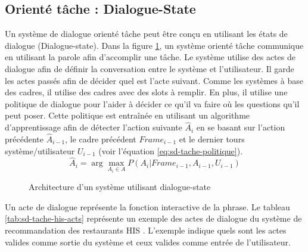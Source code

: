\documentclass{KodeBook}
\begin{document}
\subsection{Orienté tâche : Dialogue-State}

Un système de dialogue orienté tâche peut être conçu en utilisant les états de dialogue (Dialogue-state). 
Dans la figure \ref{fig:sd-tache-dial-state}, un système orienté tâche communique en utilisant la parole afin d'accomplir une tâche. 
Le système utilise des actes de dialogue afin de définir la conversation entre le système et l'utilisateur. 
Il garde les actes passés afin de décider quel est l'acte suivant.
Comme les systèmes à base des cadres, il utilise des cadres avec des slots à remplir. 
En plus, il utilise une politique de dialogue pour l'aider à décider ce qu'il va faire où les questions qu'il peut poser. 
Cette politique est entraînée en utilisant un algorithme d'apprentissage afin de détecter l'action suivante $ \hat{A}_i $ en se basant sur l'action précédente $\hat{A}_{i-1}$, le cadre précédent $Frame_{i-1}$ et le dernier tours système/utilisateur $ U_{i-1}$ (voir l'équation \ref{eq:sd-tache-politique}).
\begin{equation}\label{eq:sd-tache-politique}
\hat{A}_i = \arg\max_{A_i \in A} P(A_i | Frame_{i-1}, A_{i-1}, U_{i-1})
\end{equation}

\begin{figure}[!ht]
	\centering
	\caption[Architecture d'un système utilisant dialogue-state]{Architecture d'un système utilisant dialogue-state \cite{2016-williams-al}}
	\label{fig:sd-tache-dial-state}
\end{figure}

Un acte de dialogue représente la fonction interactive de la phrase. 
Le tableau \ref{tab:sd-tache-his-acts} représente un exemple des actes de dialogue du système de recommandation des restaurants HIS \cite{2010-young-al}. 
L'exemple indique quels sont les actes valides comme sortie du système et ceux valides comme entrée de l'utilisateur. 
\end{document}

